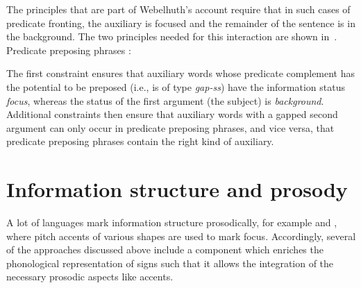 \documentclass[output=paper,biblatex,babelshorthands,newtxmath,draftmode,colorlinks,citecolor=brown]{langscibook}
\begin{document}
\noindent
The principles that are part of Webelhuth's account require that in such cases
of predicate fronting, the auxiliary is focused and the remainder of
the sentence is in the background. The two
principles needed for this interaction are shown in~.
\ea
Predicate preposing phrases \citep[]{Webelhuth2007a-u}:\\
\impl
{}

\bigskip
{}
\impl 
{}
  

  \label{fig:predicatepreposing}
\z
The first constraint ensures that auxiliary words whose predicate
complement has the potential to be preposed (i.e., is of type \textit{gap-ss}) have the
information status \textit{focus}, whereas the status of the first
argument (the subject) is \textit{background}. Additional constraints
then ensure that auxiliary words with a gapped second argument can
only occur in predicate preposing phrases, and vice versa, that
predicate preposing phrases contain the right kind of auxiliary.

\section{Information structure and prosody}
\label{sec:prosody}

A lot of languages mark information structure prosodically, for
example  and , where pitch accents of various shapes are
used to mark focus. Accordingly, several of the approaches discussed above
include a component which enriches the phonological representation
of signs such that it allows the integration of the necessary prosodic
aspects like accents.
\end{document}

